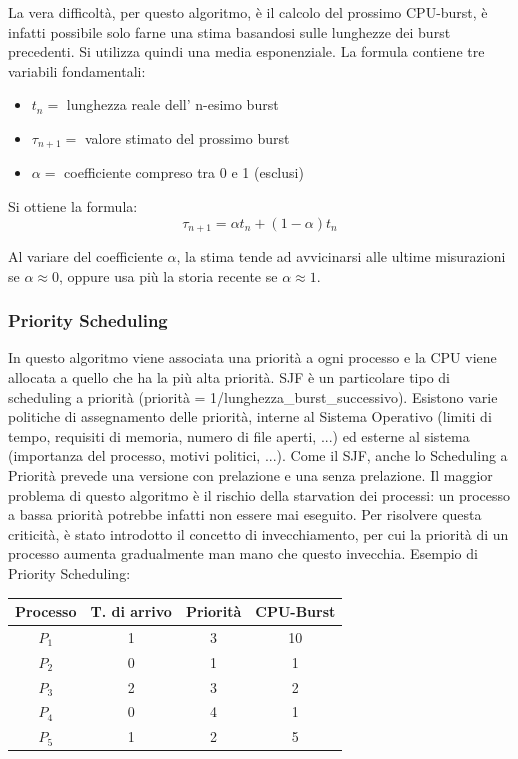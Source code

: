 \documentclass[a4paper]{article}
\begin{document}
La vera difficoltà, per questo algoritmo, è il calcolo del prossimo CPU-burst, è infatti possibile solo farne una stima basandosi sulle lunghezze dei burst precedenti. Si utilizza quindi una media esponenziale. La formula contiene tre variabili fondamentali:
\begin{itemize}
    \item $t_n =$ lunghezza reale dell' n-esimo burst
    \item $\tau_{n+1} =$ valore stimato del prossimo burst
    \item $\alpha =$ coefficiente compreso tra 0 e 1 (esclusi)
\end{itemize}

Si ottiene la formula: \newline
$$
    \tau_{n+1} = \alpha t_n + (1 - \alpha)t_n
$$

Al variare del coefficiente $\alpha$, la stima tende ad avvicinarsi alle ultime misurazioni se $\alpha \approx 0$, oppure usa più la storia recente se $\alpha \approx 1$.

\subsubsection{Priority Scheduling}
In questo algoritmo viene associata una priorità a ogni processo e la CPU viene allocata a quello che ha la più alta priorità. SJF è un particolare tipo di scheduling a priorità (priorità = 1/lunghezza\_burst\_successivo). \newline
Esistono varie politiche di assegnamento delle priorità, interne al Sistema Operativo (limiti di tempo, requisiti di memoria, numero di file aperti, ...) ed esterne al sistema (importanza del processo, motivi politici, ...). Come il SJF, anche lo Scheduling a Priorità prevede una versione con prelazione e una senza prelazione.\newline
Il maggior problema di questo algoritmo è il rischio della starvation dei processi: un processo a bassa priorità potrebbe infatti non essere mai eseguito. Per risolvere questa criticità, è stato introdotto il concetto di invecchiamento, per cui la priorità di un processo aumenta gradualmente man mano che questo invecchia. \newline
Esempio di Priority Scheduling:

\begin{table}[htb]
    \centering
    \label{my-label}
    \begin{tabular}{|c|c|c|c|}
        \hline
        Processo & T. di arrivo & Priorità & CPU-Burst \\ \hline
        $P_1$    & 1            & 3        & 10        \\ \hline
        $P_2$    & 0            & 1        & 1         \\ \hline
        $P_3$    & 2            & 3        & 2         \\ \hline
        $P_4$    & 0            & 4        & 1         \\ \hline
        $P_5$    & 1            & 2        & 5         \\ \hline
    \end{tabular}
\end{table}
\end{document}
